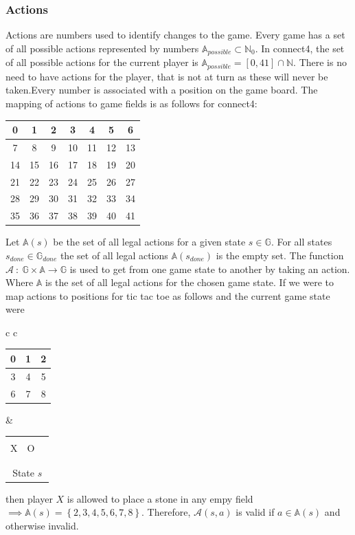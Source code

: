 \documentclass[12pt]{article}
\newcommand{\tickTackToe}[9]{
\begin{tabular}{p{7px}|p{7px}|p{7px}}
\multicolumn{3}{c}{}\\
  #1 & #2 & #3 \\      \hline
  #4 & #5 & #6 \\      \hline
   & #7 & #8\\
\multicolumn{3}{c}{#9}
\end{tabular}
}
\begin{document}
\subsubsection{Actions}
Actions are numbers used to identify changes to the game. Every game has a set of all possible actions represented by numbers \(\mathbb{A}_{possible} \subset \mathbb{N}_0\). In connect4, the set of all possible actions for the current player is \(\mathbb{A}_{possible} = [0, 41]\cap\mathbb N\). There is no need to have actions for the player, that is not at turn as these will never be taken.\newpage\noindent Every number is associated with a position on the game board. The mapping of actions to game fields is as follows for connect4:
\begin{center}
\begin{tabular}{| c | c | c | c | c | c | c |}
 \hline
0 & 1 & 2 & 3 & 4 & 5 & 6  \\\hline
7 & 8 & 9 & 10 & 11 & 12 & 13\\\hline
14 & 15 & 16 & 17 & 18 & 19 & 20 \\\hline
21 & 22 & 23& 24 & 25 & 26 & 27 \\\hline
28 & 29 & 30 & 31 & 32 & 33 & 34 \\\hline
35 & 36 & 37 & 38 & 39 & 40 & 41 \\\hline
\end{tabular}
\end{center}
Let \(\mathbb{A}(s)\) be the set of all legal actions for a given state  \(s \in \mathbb{G}\). For all states \(s_{done} \in \mathbb{G}_{done}\) the set of all legal actions \(\mathbb{A}(s_{done})\) is the empty set. The function \(\mathcal{A}~:~\mathbb{G}\times\mathbb{A}\to\mathbb{G}\) is used to get from one game state to another by taking an action. Where \(\mathbb A\) is the set of all legal actions for the chosen game state. If we were to map actions to positions for tic tac toe as follows and the current game state were
\begin{center}\begin{tabular} { c c }
\begin{tabular}{| c | c | c |}
 \hline
 0 & 1 & 2 \\\hline
 3 & 4 & 5 \\\hline
 6 & 7 & 8 \\\hline
\end{tabular} & \tickTackToe{X}{O}{}{}{}{}{}{}{State \(s\)}
\end{tabular}\end{center}
then player \(X\) is allowed to place a stone in any empy field \(\implies\mathbb A(s) = \left\{ 2, 3, 4, 5, 6, 7, 8 \right\}\). Therefore, \(\mathcal A(s, a)\) is valid if \(a \in \mathbb A(s)\) and otherwise invalid.
\end{document}

